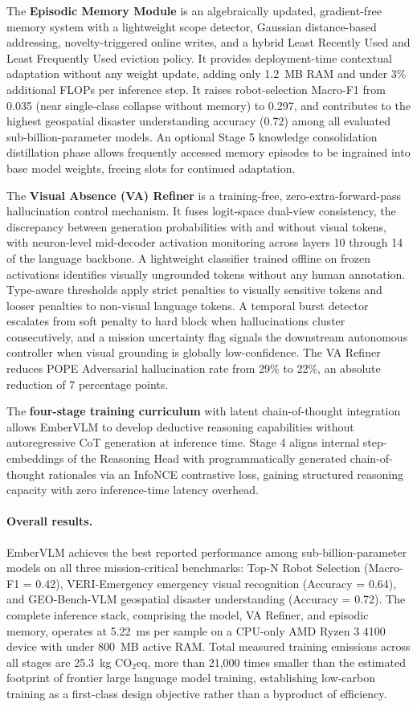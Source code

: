 The \textbf{Episodic Memory Module} is an algebraically updated, gradient-free memory system with a lightweight scope detector, Gaussian distance-based addressing, novelty-triggered online writes, and a hybrid Least Recently Used and Least Frequently Used eviction policy. It provides deployment-time contextual adaptation without any weight update, adding only 1.2~MB RAM and under 3\% additional FLOPs per inference step. It raises robot-selection Macro-F1 from 0.035 (near single-class collapse without memory) to 0.297, and contributes to the highest geospatial disaster understanding accuracy (0.72) among all evaluated sub-billion-parameter models. An optional Stage 5 knowledge consolidation distillation phase allows frequently accessed memory episodes to be ingrained into base model weights, freeing slots for continued adaptation.

The \textbf{Visual Absence (VA) Refiner} is a training-free, zero-extra-forward-pass hallucination control mechanism. It fuses logit-space dual-view consistency, the discrepancy between generation probabilities with and without visual tokens, with neuron-level mid-decoder activation monitoring across layers 10 through 14 of the language backbone. A lightweight classifier trained offline on frozen activations identifies visually ungrounded tokens without any human annotation. Type-aware thresholds apply strict penalties to visually sensitive tokens and looser penalties to non-visual language tokens. A temporal burst detector escalates from soft penalty to hard block when hallucinations cluster consecutively, and a mission uncertainty flag signals the downstream autonomous controller when visual grounding is globally low-confidence. The VA Refiner reduces POPE Adversarial hallucination rate from 29\% to 22\%, an absolute reduction of 7 percentage points.

The \textbf{four-stage training curriculum} with latent chain-of-thought integration allows EmberVLM to develop deductive reasoning capabilities without autoregressive CoT generation at inference time. Stage 4 aligns internal step-embeddings of the Reasoning Head with programmatically generated chain-of-thought rationales via an InfoNCE contrastive loss, gaining structured reasoning capacity with zero inference-time latency overhead.

\paragraph{Overall results.}
EmberVLM achieves the best reported performance among sub-billion-parameter models on all three mission-critical benchmarks: Top-N Robot Selection (Macro-F1 = 0.42), VERI-Emergency emergency visual recognition (Accuracy = 0.64), and GEO-Bench-VLM geospatial disaster understanding (Accuracy = 0.72). The complete inference stack, comprising the model, VA Refiner, and episodic memory, operates at 5.22~ms per sample on a CPU-only AMD Ryzen 3 4100 device with under 800~MB active RAM. Total measured training emissions across all stages are 25.3~kg CO$_2$eq, more than 21{,}000 times smaller than the estimated footprint of frontier large language model training, establishing low-carbon training as a first-class design objective rather than a byproduct of efficiency.

